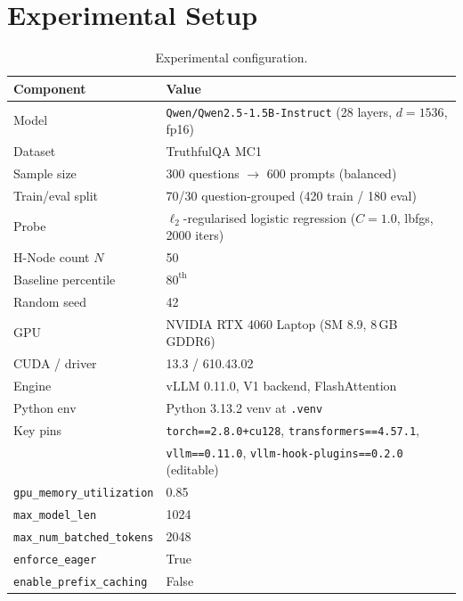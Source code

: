 \documentclass[11pt]{article}
\begin{document}
\section{Experimental Setup}

\begin{table}[h]
\centering
\caption{Experimental configuration.}
\label{tab:setup}
\begin{tabular}{ll}
\toprule
\textbf{Component} & \textbf{Value}\\
\midrule
Model              & \texttt{Qwen/Qwen2.5-1.5B-Instruct} (28 layers, $d{=}1536$, fp16)\\
Dataset            & TruthfulQA MC1\\
Sample size        & 300 questions $\rightarrow$ 600 prompts (balanced)\\
Train/eval split   & 70/30 question-grouped (420 train / 180 eval)\\
Probe              & $\ell_2$-regularised logistic regression ($C{=}1.0$, lbfgs, 2000 iters)\\
H-Node count $N$   & 50\\
Baseline percentile& $80^{\text{th}}$\\
Random seed        & 42\\
\midrule
GPU                & NVIDIA RTX 4060 Laptop (SM 8.9, 8\,GB GDDR6)\\
CUDA / driver      & 13.3 / 610.43.02\\
Engine             & vLLM 0.11.0, V1 backend, FlashAttention\\
Python env         & Python 3.13.2 venv at \texttt{.venv}\\
Key pins           & \texttt{torch==2.8.0+cu128}, \texttt{transformers==4.57.1},\\
                   & \texttt{vllm==0.11.0}, \texttt{vllm-hook-plugins==0.2.0} (editable)\\
\midrule
\texttt{gpu\_memory\_utilization} & 0.85\\
\texttt{max\_model\_len}          & 1024\\
\texttt{max\_num\_batched\_tokens}& 2048\\
\texttt{enforce\_eager}           & True\\
\texttt{enable\_prefix\_caching}  & False\\
\bottomrule
\end{tabular}
\end{table}
\end{document}

